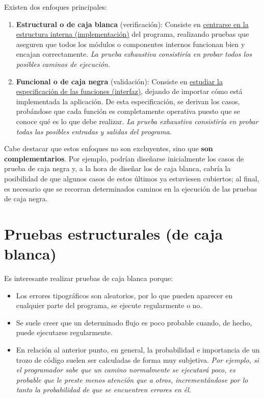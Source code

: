 Existen dos enfoques principales:

\begin{enumerate}
    \item \textbf{Estructural o de caja blanca} (verificación): Consiste en \uline{centrarse en la estructura interna (implementación)} del programa, realizando pruebas que aseguren que todos los módulos o componentes internos funcionan bien y encajan correctamente. \textit{La prueba exhaustiva consistiría en probar todos los posibles caminos de ejecución.}
    \item \textbf{Funcional o de caja negra} (validación): Consiste en \uline{estudiar la especificación de las funciones (interfaz)}, dejando de importar cómo está implementada la aplicación. De esta especificación, se derivan los casos, probándose que cada función es completamente operativa puesto que se conoce qué es lo que debe realizar. \textit{La prueba exhaustiva consistiría en probar todas las posibles entradas y salidas del programa.}
\end{enumerate}

Cabe destacar que estos enfoques no son excluyentes, sino que \textbf{son complementarios}. Por ejemplo, podrían diseñarse inicialmente los casos de prueba de caja negra y, a la hora de diseñar los de caja blanca, cabría la posibilidad de que algunos casos de estos últimos ya estuviesen cubiertos; al final, es necesario que se recorran determinados caminos en la ejecución de las pruebas de caja negra.


\section{Pruebas estructurales (de caja blanca)}

Es interesante realizar pruebas de caja blanca porque:

\begin{itemize}
    \item Los errores tipográficos son aleatorios, por lo que pueden aparecer en cualquier parte del programa, se ejecute regularmente o no.
    \item Se suele creer que un determinado flujo es poco probable cuando, de hecho, puede ejecutarse regularmente.
    \item En relación al anterior punto, en general, la probabilidad e importancia de un trozo de código suelen ser calculadas de forma muy subjetiva. \textit{Por ejemplo, si el programador sabe que un camino normalmente se ejecutará poco, es probable que le preste menos atención que a otros, incrementándose por lo tanto la probabilidad de que se encuentren errores en él.}
\end{itemize}

